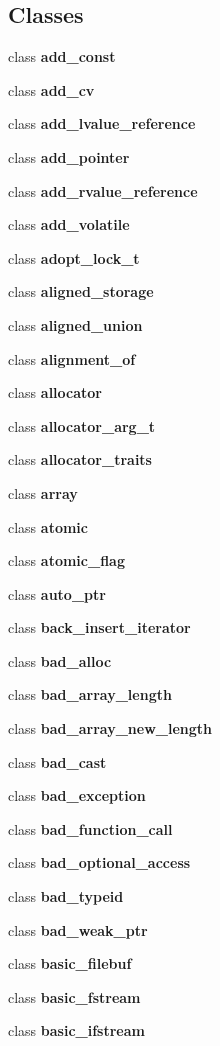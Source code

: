 \subsection*{Classes}
\begin{DoxyCompactItemize}
\item 
class {\bf add\+\_\+const}
\item 
class {\bf add\+\_\+cv}
\item 
class {\bf add\+\_\+lvalue\+\_\+reference}
\item 
class {\bf add\+\_\+pointer}
\item 
class {\bf add\+\_\+rvalue\+\_\+reference}
\item 
class {\bf add\+\_\+volatile}
\item 
class {\bf adopt\+\_\+lock\+\_\+t}
\item 
class {\bf aligned\+\_\+storage}
\item 
class {\bf aligned\+\_\+union}
\item 
class {\bf alignment\+\_\+of}
\item 
class {\bf allocator}
\item 
class {\bf allocator\+\_\+arg\+\_\+t}
\item 
class {\bf allocator\+\_\+traits}
\item 
class {\bf array}
\item 
class {\bf atomic}
\item 
class {\bf atomic\+\_\+flag}
\item 
class {\bf auto\+\_\+ptr}
\item 
class {\bf back\+\_\+insert\+\_\+iterator}
\item 
class {\bf bad\+\_\+alloc}
\item 
class {\bf bad\+\_\+array\+\_\+length}
\item 
class {\bf bad\+\_\+array\+\_\+new\+\_\+length}
\item 
class {\bf bad\+\_\+cast}
\item 
class {\bf bad\+\_\+exception}
\item 
class {\bf bad\+\_\+function\+\_\+call}
\item 
class {\bf bad\+\_\+optional\+\_\+access}
\item 
class {\bf bad\+\_\+typeid}
\item 
class {\bf bad\+\_\+weak\+\_\+ptr}
\item 
class {\bf basic\+\_\+filebuf}
\item 
class {\bf basic\+\_\+fstream}
\item 
class {\bf basic\+\_\+ifstream}

\end{DoxyCompactItemize}
